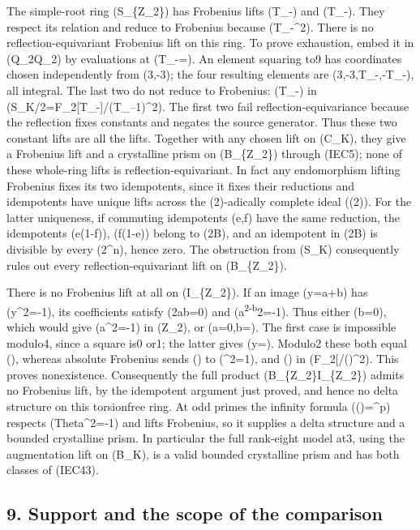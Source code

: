 \documentclass[
]{article}
\begin{document}
The simple-root ring (S\_\{\mathbb Z\_2\}) has Frobenius lifts
(T\_-) and (T\_-). They respect its relation and reduce
to Frobenius because (T\_-\^{}2). There is no
reflection-equivariant Frobenius lift on this ring. To prove exhaustion,
embed it in (\mathbb Q\_2\times\mathbb Q\_2) by evaluations at
(T\_-=). An element squaring to9 has coordinates chosen
independently from (3,-3); the four resulting elements are
(3,-3,T\_-,-T\_-), all integral. The last two do not reduce to
Frobenius: (T\_-) in (S\_K/2=\mathbb F\_2{[}T\_-{]}/(T\_--1)\^{}2).
The first two fail reflection-equivariance because the reflection fixes
constants and negates the source generator. Thus these two constant
lifts are all the lifts. Together with any chosen lift on (C\_K), they
give a Frobenius lift and a crystalline prism on (B\_\{\mathbb Z\_2\})
through (IEC5); none of these whole-ring lifts is
reflection-equivariant. In fact any endomorphism lifting Frobenius fixes
its two idempotents, since it fixes their reductions and idempotents
have unique lifts across the (2)-adically complete ideal ((2)). For the
latter uniqueness, if commuting idempotents (e,f) have the same
reduction, the idempotents (e(1-f)), (f(1-e)) belong to (2B), and an
idempotent in (2B) is divisible by every (2\^{}n), hence zero. The
obstruction from (S\_K) consequently rules out every
reflection-equivariant lift on (B\_\{\mathbb Z\_2\}).

There is no Frobenius lift at all on (I\_\{\mathbb Z\_2\}). If an image
(y=a+b\Theta) has (y\^{}2=-1), its coefficients satisfy (2ab=0) and
(a\textsuperscript{2-b}2=-1). Thus either (b=0), which would give
(a\^{}2=-1) in (\mathbb Z\_2), or (a=0,b=). The first case is
impossible modulo4, since a square is0 or1; the latter gives
(y=\pm\Theta). Modulo2 these both equal (\Theta), whereas absolute
Frobenius sends (\Theta) to (\Theta\^{}2=1), and () in
(\mathbb F\_2{[}\Theta{]}/()\^{}2). This proves nonexistence.
Consequently the full product
(B\_\{\mathbb Z\_2\}\times I\_\{\mathbb Z\_2\}) admits no Frobenius
lift, by the idempotent argument just proved, and hence no delta
structure on this torsionfree ring. At odd primes the infinity formula
(\Phi(\Theta)=\Theta\^{}p) respects (Theta\^{}2=-1) and lifts Frobenius,
so it supplies a delta structure and a bounded crystalline prism. In
particular the full rank-eight model at3, using the augmentation lift on
(B\_K), is a valid bounded crystalline prism and has both classes of
(IEC43).

\subsection{9. Support and the scope of the
comparison}\label{support-and-the-scope-of-the-comparison}
\end{document}
